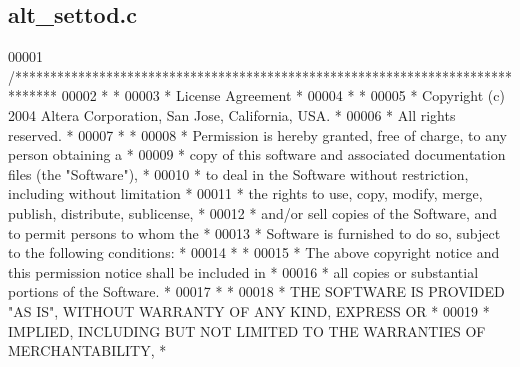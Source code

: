 \subsection{alt\+\_\+settod.\+c}
\label{alt__settod_8c_source}

\begin{DoxyCode}
00001 \textcolor{comment}{/******************************************************************************}
00002 \textcolor{comment}{*                                                                             *}
00003 \textcolor{comment}{* License Agreement                                                           *}
00004 \textcolor{comment}{*                                                                             *}
00005 \textcolor{comment}{* Copyright (c) 2004 Altera Corporation, San Jose, California, USA.           *}
00006 \textcolor{comment}{* All rights reserved.                                                        *}
00007 \textcolor{comment}{*                                                                             *}
00008 \textcolor{comment}{* Permission is hereby granted, free of charge, to any person obtaining a     *}
00009 \textcolor{comment}{* copy of this software and associated documentation files (the "Software"),  *}
00010 \textcolor{comment}{* to deal in the Software without restriction, including without limitation   *}
00011 \textcolor{comment}{* the rights to use, copy, modify, merge, publish, distribute, sublicense,    *}
00012 \textcolor{comment}{* and/or sell copies of the Software, and to permit persons to whom the       *}
00013 \textcolor{comment}{* Software is furnished to do so, subject to the following conditions:        *}
00014 \textcolor{comment}{*                                                                             *}
00015 \textcolor{comment}{* The above copyright notice and this permission notice shall be included in  *}
00016 \textcolor{comment}{* all copies or substantial portions of the Software.                         *}
00017 \textcolor{comment}{*                                                                             *}
00018 \textcolor{comment}{* THE SOFTWARE IS PROVIDED "AS IS", WITHOUT WARRANTY OF ANY KIND, EXPRESS OR  *}
00019 \textcolor{comment}{* IMPLIED, INCLUDING BUT NOT LIMITED TO THE WARRANTIES OF MERCHANTABILITY,    *}

\end{DoxyCode}
